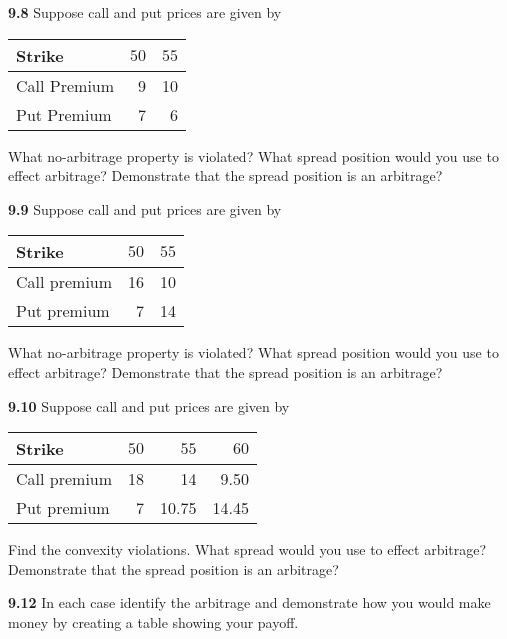 \documentclass[
  letterpaper,
  DIV=11,
  numbers=noendperiod]{scrartcl}
\begin{document}
\textbf{9.8} Suppose call and put prices are given by

\begin{longtable}[]{@{}lrr@{}}
\toprule\noalign{}
\textbf{Strike} & \textbf{\(50\)} & \textbf{\(55\)} \\
\midrule\noalign{}
\endhead
\bottomrule\noalign{}
\endlastfoot
Call Premium & 9 & 10 \\
Put Premium & 7 & 6 \\
\end{longtable}

What no-arbitrage property is violated? What spread position would you
use to effect arbitrage? Demonstrate that the spread position is an
arbitrage?

\textbf{9.9} Suppose call and put prices are given by

\begin{longtable}[]{@{}lrr@{}}
\toprule\noalign{}
\textbf{Strike} & \textbf{\(50\)} & \textbf{\(55\)} \\
\midrule\noalign{}
\endhead
\bottomrule\noalign{}
\endlastfoot
Call premium & 16 & 10 \\
Put premium & 7 & 14 \\
\end{longtable}

What no-arbitrage property is violated? What spread position would you
use to effect arbitrage? Demonstrate that the spread position is an
arbitrage?

\textbf{9.10} Suppose call and put prices are given by

\begin{longtable}[]{@{}lrrr@{}}
\toprule\noalign{}
\textbf{Strike} & \textbf{\(50\)} & \textbf{\(55\)} & \textbf{\(60\)} \\
\midrule\noalign{}
\endhead
\bottomrule\noalign{}
\endlastfoot
Call premium & 18 & 14 & 9.50 \\
Put premium & 7 & 10.75 & 14.45 \\
\end{longtable}

Find the convexity violations. What spread would you use to effect
arbitrage? Demonstrate that the spread position is an arbitrage?

\textbf{9.12} In each case identify the arbitrage and demonstrate how
you would make money by creating a table showing your payoff.
\end{document}
